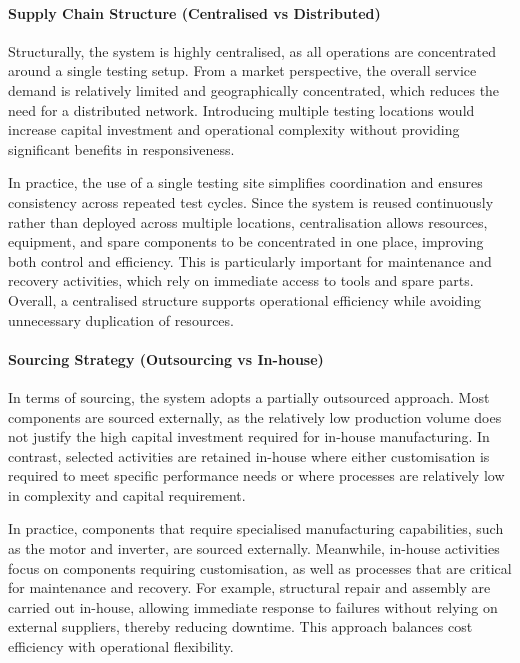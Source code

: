 \paragraph{Supply Chain Structure (Centralised vs Distributed)}

Structurally, the system is highly centralised, as all operations are concentrated around a single testing setup. From a market perspective, the overall service demand is relatively limited and geographically concentrated, which reduces the need for a distributed network. Introducing multiple testing locations would increase capital investment and operational complexity without providing significant benefits in responsiveness.

In practice, the use of a single testing site simplifies coordination and ensures consistency across repeated test cycles. Since the system is reused continuously rather than deployed across multiple locations, centralisation allows resources, equipment, and spare components to be concentrated in one place, improving both control and efficiency. This is particularly important for maintenance and recovery activities, which rely on immediate access to tools and spare parts. Overall, a centralised structure supports operational efficiency while avoiding unnecessary duplication of resources.

\paragraph{Sourcing Strategy (Outsourcing vs In-house)}

In terms of sourcing, the system adopts a partially outsourced approach. Most components are sourced externally, as the relatively low production volume does not justify the high capital investment required for in-house manufacturing. In contrast, selected activities are retained in-house where either customisation is required to meet specific performance needs or where processes are relatively low in complexity and capital requirement.

In practice, components that require specialised manufacturing capabilities, such as the motor and inverter, are sourced externally. Meanwhile, in-house activities focus on components requiring customisation, as well as processes that are critical for maintenance and recovery. For example, structural repair and assembly are carried out in-house, allowing immediate response to failures without relying on external suppliers, thereby reducing downtime. This approach balances cost efficiency with operational flexibility.


